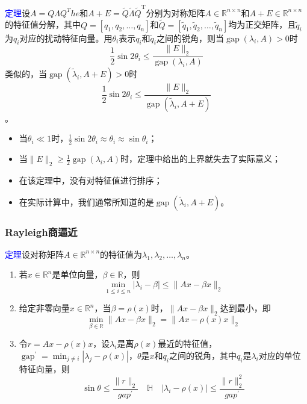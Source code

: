 \documentclass[12pt,a4paper]{article}
\begin{document}
\textcolor{blue}{定理}\quad 设$A=Q\Lambda Q^The$和$A+E=\tilde{Q} \tilde{\Lambda} \tilde{Q}^{\mathrm{T}}$分别为对称矩阵$A \in \mathbb{R}^{n \times n}$和$A+E \in \mathbb{R}^{n \times n}$的特征值分解，其中$Q=\left[q_{1}, q_{2}, \ldots, q_{n}\right]$和$\tilde{Q}=\left[\tilde{q}_{1}, \tilde{q}_{2}, \ldots, \tilde{q}_{n}\right]$均为正交矩阵，且$\tilde{q}_{i}$为$q_{i}$对应的扰动特征向量。用$\theta_i$表示$q_{i}$和$\tilde{q}_{i}$之间的锐角，则当$\operatorname{gap}\left(\lambda_{i}, A\right)>0$时$$
\frac{1}{2} \sin 2 \theta_{i} \leq \frac{\|E\|_{2}}{\operatorname{gap}\left(\lambda_{i}, A\right)}
$$类似的，当$\operatorname{gap}\left(\tilde{\lambda}_{i}, A+E\right)>0$时$$
\frac{1}{2} \sin 2 \theta_{i} \leq \frac{\|E\|_{2}}{\operatorname{gap}\left(\tilde{\lambda}_{i}, A+E\right)}
$$。
\begin{itemize}
	\item 当$\theta_{i} \ll 1$时，$\frac{1}{2} \sin 2 \theta_{i} \approx \theta_{i} \approx \sin \theta_{i}$；
	\item 当$\|E\|_{2} \geq \frac{1}{2} \operatorname{gap}\left(\lambda_{i}, A\right)$时，定理中给出的上界就失去了实际意义；
	\item 在该定理中，没有对特征值进行排序；
	\item 在实际计算中，我们通常所知道的是$\operatorname{gap}\left(\tilde{\lambda}_{i}, A+E\right)$。
\end{itemize}
\subsubsection{Rayleigh商逼近}
\textcolor{blue}{定理}\quad 设对称矩阵$A \in \mathbb{R}^{n \times n}$的特征值为$\lambda_{1}, \lambda_{2}, \ldots, \lambda_{n}$。
\begin{enumerate}[(1)]
	\item 若$x \in \mathbb{R}^{n}$是单位向量，$\beta \in \mathbb{R}$，则\begin{equation}
	\min _{1 \leq i \leq n}\left|\lambda_{i}-\beta\right| \leq\|A x-\beta x\|_{2}
	\label{equation5.15}
	\end{equation}
	\item 给定非零向量$x \in \mathbb{R}^{n}$，当$\beta=\rho(x)$时，$\|A x-\beta x\|_{2}$达到最小，即\begin{equation}
	\min _{\beta \in \mathbb{R}}\|A x-\beta x\|_{2}=\|A x-\rho(x) x\|_{2}
	\label{equation5.16}
	\end{equation}
	\item 令$r=A x-\rho(x) x$，设$\lambda_{i}$是离$\rho(x)$最近的特征值，$\operatorname{gap}^{\prime}=\min _{j \neq i} | \lambda_{j}-\rho(x) |$，$\theta$是$x$和$q_i$之间的锐角，其中$q_i$是$\lambda_{i}$对应的单位特征向量，则\begin{equation}
	\sin \theta \leq \frac{\|r\|_{2}}{g a p^{\prime}} \quad \mathbb{H} \quad\left|\lambda_{i}-\rho(x)\right| \leq \frac{\|r\|_{2}^{2}}{g a p^{\prime}}
	\label{equation5.17}
	\end{equation}
\end{enumerate}
\end{document}
